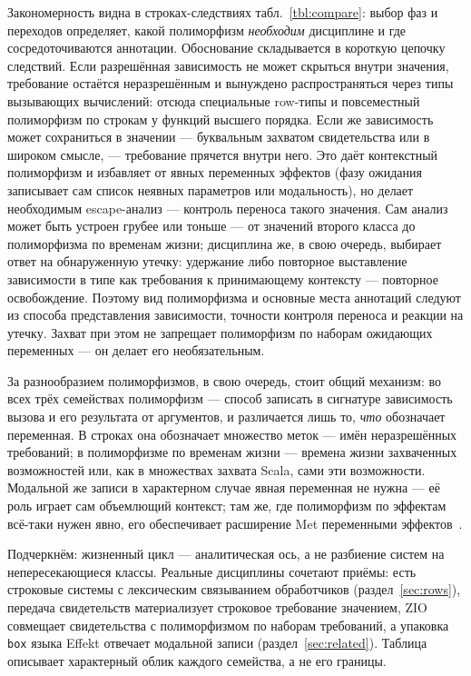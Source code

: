 \documentclass{ProcISPRAS}
\begin{document}
Закономерность видна в строках-следствиях табл.~\ref{tbl:compare}: выбор фаз и переходов
определяет, какой полиморфизм \emph{необходим} дисциплине и где сосредоточиваются
аннотации. Обоснование складывается в короткую цепочку следствий. Если разрешённая зависимость не может
скрыться внутри значения, требование остаётся неразрешённым и вынуждено распространяться через типы
вызывающих вычислений: отсюда специальные row-типы и повсеместный полиморфизм по
строкам у функций высшего порядка. Если же зависимость может сохраниться в значении ---
буквальным захватом свидетельства или в широком смысле, ---
требование прячется внутри него. Это даёт контекстный полиморфизм и избавляет от
явных переменных эффектов (фазу ожидания записывает сам список неявных параметров или
модальность), но делает необходимым escape-анализ --- контроль переноса такого
значения. Сам анализ может быть устроен грубее или тоньше --- от значений второго
класса до полиморфизма по временам жизни; дисциплина же, в свою очередь, выбирает
ответ на обнаруженную утечку: удержание либо повторное выставление
зависимости в типе как требования к принимающему контексту --- повторное освобождение.
Поэтому вид полиморфизма и основные места аннотаций следуют из способа представления
зависимости, точности контроля переноса и реакции на утечку. Захват при этом
не запрещает полиморфизм по наборам ожидающих переменных --- он делает его необязательным.

За разнообразием полиморфизмов, в свою очередь, стоит общий механизм: во всех трёх
семействах полиморфизм --- способ записать в сигнатуре зависимость вызова и его
результата от аргументов, и различается лишь то, \emph{что} обозначает переменная. В
строках она обозначает множество меток --- имён неразрешённых требований; в полиморфизме
по временам жизни --- времена жизни захваченных возможностей или, как в множествах
захвата Scala, сами эти возможности. Модальной же записи в характерном случае явная переменная не нужна --- её роль
играет сам объемлющий контекст; там же, где полиморфизм по эффектам всё-таки нужен
явно, его обеспечивает расширение Met переменными эффектов~\cite{tang2025modal}.

Подчеркнём: жизненный цикл --- аналитическая ось, а не разбиение систем на
непересекающиеся классы. Реальные дисциплины сочетают приёмы: есть строковые системы с
лексическим связыванием обработчиков (раздел~\ref{sec:rows}), передача свидетельств
материализует строковое требование значением, ZIO~\cite{zio-lib} совмещает свидетельства с
полиморфизмом по наборам требований, а упаковка \texttt{box} языка Effekt отвечает
модальной записи (раздел~\ref{sec:related}). Таблица описывает характерный облик
каждого семейства, а не его границы.
\end{document}
